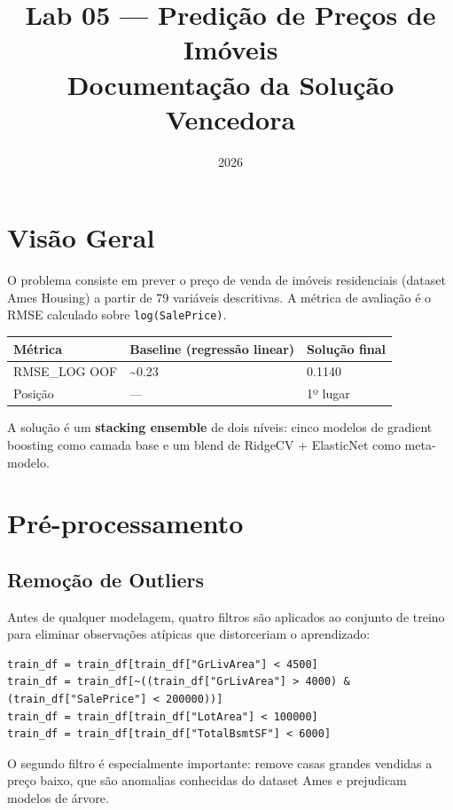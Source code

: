 \documentclass[11pt]{article}
\date{2026}
\title{Lab 05 — Predição de Preços de Imóveis\\\medskip
\large Documentação da Solução Vencedora}
\begin{document}
\maketitle
\setcounter{tocdepth}{2}
\tableofcontents

\section{Visão Geral}
\label{sec:org18ea467}

O problema consiste em prever o preço de venda de imóveis residenciais
(dataset Ames Housing) a partir de 79 variáveis descritivas. A métrica
de avaliação é o RMSE calculado sobre \texttt{log(SalePrice)}.

\begin{center}
\begin{tabular}{lll}
Métrica & Baseline (regressão linear) & Solução final\\
\hline
RMSE\_LOG OOF & \textasciitilde{}0.23 & 0.1140\\
Posição & — & 1º lugar\\
\end{tabular}
\end{center}

A solução é um \textbf{stacking ensemble} de dois níveis: cinco modelos de
gradient boosting como camada base e um blend de RidgeCV + ElasticNet
como meta-modelo.
\section{Pré-processamento}
\label{sec:org332e0c5}

\subsection{Remoção de Outliers}
\label{sec:orgfdda29f}

Antes de qualquer modelagem, quatro filtros são aplicados ao conjunto
de treino para eliminar observações atípicas que distorceriam o
aprendizado:

\begin{verbatim}
train_df = train_df[train_df["GrLivArea"] < 4500]
train_df = train_df[~((train_df["GrLivArea"] > 4000) & (train_df["SalePrice"] < 200000))]
train_df = train_df[train_df["LotArea"] < 100000]
train_df = train_df[train_df["TotalBsmtSF"] < 6000]
\end{verbatim}

O segundo filtro é especialmente importante: remove casas grandes
vendidas a preço baixo, que são anomalias conhecidas do dataset Ames e
prejudicam modelos de árvore.
\end{document}
